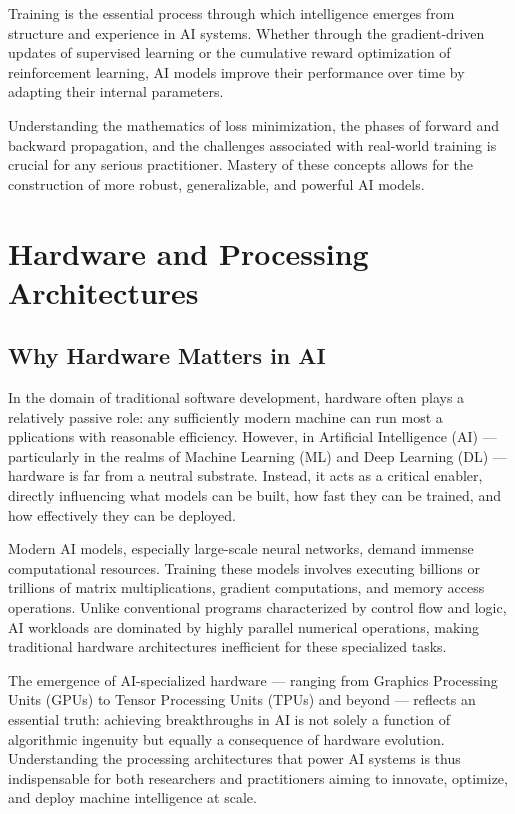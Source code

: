 \documentclass[openany]{book}
\begin{document}
Training is the essential process through which intelligence emerges from 
structure and experience in AI systems. Whether through the gradient-driven 
updates of supervised learning or the cumulative reward optimization of 
reinforcement learning, AI models improve their performance over time by 
adapting their internal parameters.

Understanding the mathematics of loss minimization, the phases of forward and 
backward propagation, and the challenges associated with real-world training is 
crucial for any serious practitioner. Mastery of these concepts allows for the 
construction of more robust, generalizable, and powerful AI models.

\chapter{Hardware and Processing Architectures}

\section{Why Hardware Matters in AI}

In the domain of traditional software development, hardware often plays a 
relatively passive role: any sufficiently modern machine can run most a
pplications with reasonable efficiency. However, in Artificial Intelligence (AI) 
— particularly in the realms of Machine Learning (ML) and Deep Learning (DL) — 
hardware is far from a neutral substrate. Instead, it acts as a critical 
enabler, directly influencing what models can be built, how fast they can be 
trained, and how effectively they can be deployed.

Modern AI models, especially large-scale neural networks, demand immense 
computational resources. Training these models involves executing billions or 
trillions of matrix multiplications, gradient computations, and memory access 
operations. Unlike conventional programs characterized by control flow and 
logic, AI workloads are dominated by highly parallel numerical operations, 
making traditional hardware architectures inefficient for these specialized 
tasks.

The emergence of AI-specialized hardware — ranging from Graphics Processing 
Units (GPUs) to Tensor Processing Units (TPUs) and beyond — reflects an 
essential truth: achieving breakthroughs in AI is not solely a function of 
algorithmic ingenuity but equally a consequence of hardware evolution. 
Understanding the processing architectures that power AI systems is thus 
indispensable for both researchers and practitioners aiming to innovate, 
optimize, and deploy machine intelligence at scale.
\end{document}
